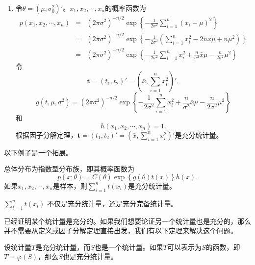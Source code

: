 \begin{example}
\begin{enumerate}
\item 令$\theta = (\mu,\sigma_0^2)'$。$x_1,x_2,\cdots,x_n$的概率函数为
    \begin{eqnarray*}
        p(x_1,x_2,\cdots,x_n) &=
        &(2\pi\sigma^2)^{-n/2} \exp\left\{ - \frac{1}{2\sigma^2} \sum_{i=1}^n (x_i-\mu)^2\right\}\\
        &=&(2\pi\sigma^2)^{-n/2}  \exp\left\{ - \frac{1}{2\sigma^2} \left(\sum_{i=1}^n x_i^2 - 2n \bar{x}\mu + n\mu^2\right)\right\}\\
        &=& (2\pi\sigma^2)^{-n/2}  \exp\left\{ - \frac{1}{2\sigma^2} \sum_{i=1}^n x_i^2 + \frac{n}{\sigma^2} \bar{x}\mu -\frac{n}{2\sigma^2}\mu^2\right\}
    \end{eqnarray*}
令$$
\bm{t} = (t_1,t_2)' = (\bar{x},\sum_{i=1}^n x_i^2)',
$$
$$
g(t,\mu,\sigma^2) = (2\pi\sigma^2)^{-n/2}  \exp\left\{ - \frac{1}{2\sigma^2} \sum_{i=1}^n x_i^2 + \frac{n}{\sigma^2} \bar{x}\mu -\frac{n}{2\sigma^2}\mu^2\right\}
$$
和
$$
h(x_1,x_2,\cdots,x_n) = 1.
$$
根据因子分解定理，$\bm{t} = (t_1,t_2)' = (\bar{x},\sum_{i=1}^n x_i^2)'$是充分统计量。
\end{enumerate}
\end{example}

以下例子是一个拓展。

\begin{example}
    总体分布为指数型分布族，即其概率函数为
    $$
    p(x;\theta) = C(\theta) \exp\left\{g(\theta) t(x)\right\}h(x).
    $$
    如果$x_1,x_2,\cdots,x_n$是样本，则$\sum_{i=1}^n t(x_i)$是充分统计量。
\end{example}
\begin{remark}
    $\sum_{i=1}^n t(x_i)$ 不仅是充分统计量，还是充分完备统计量。
\end{remark}

已经证明某个统计量是充分的。如果我们想要论证另一个统计量也是充分的，那么并不需要从定义或因子分解定理直接出发，我们有以下定理来解决这个问题。
\begin{theorem}
设统计量$T$是充分统计量，而$S$也是一个统计量。如果$T$可以表示为$S$的函数，即$T=\varphi(S)$，那么$S$也是充分统计量。
\end{theorem}


